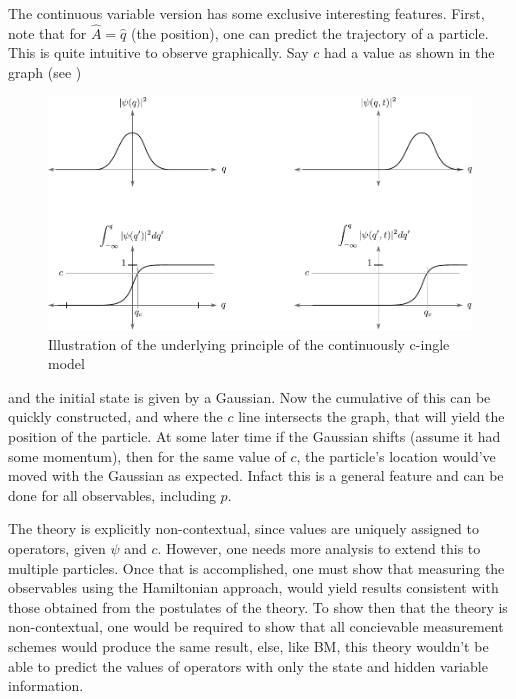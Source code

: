 The continuous variable version has some exclusive interesting features.
First, note that for $\hat{A}=\hat{q}$ (the position), one can predict
the trajectory of a particle. This is quite intuitive to observe graphically.
Say $c$ had a value as shown in the graph (see )
\begin{figure}
\centering{}\includegraphics[width=0.95\columnwidth]{Chapter4/Figs/Vector/cingle}\caption{Illustration of the underlying principle of the continuously c-ingle
model\label{fig:Illustration-of-cingle}}
\end{figure}
and the initial state is given by a Gaussian. Now the cumulative of
this can be quickly constructed, and where the $c$ line intersects
the graph, that will yield the position of the particle. At some later
time if the Gaussian shifts (assume it had some momentum), then for
the same value of $c$, the particle's location would've moved with
the Gaussian as expected. Infact this is a general feature and can
be done for all observables, including $p$. %

The theory is explicitly non-contextual, since values are uniquely
assigned to operators, given $\psi$ and $c$. However, one needs
more analysis to extend this to multiple particles. Once that is accomplished,
one must show that measuring the observables using the Hamiltonian
approach, would yield results consistent with those obtained from
the postulates of the theory. To show then that the theory is non-contextual,
one would be required to show that all concievable measurement schemes
would produce the same result, else, like BM, this theory wouldn't
be able to predict the values of operators with only the state and
hidden variable information. %
